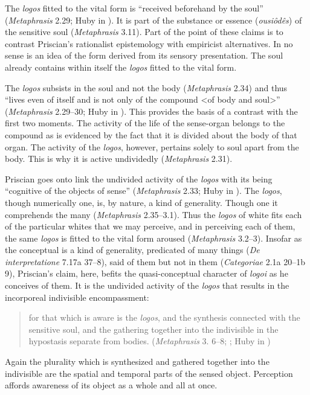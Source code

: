 \documentclass[12pt]{article}
\begin{document}
The \emph{logos} fitted to the vital form is ``received beforehand by the soul'' (\emph{Metaphrasis} 2.29; Huby in \citealt[10]{Sorabji:1997ly}). It is part of the substance or essence (\emph{ousiôdês}) of the sensitive soul (\emph{Metaphrasis} 3.11). Part of the point of these claims is to contrast Priscian's rationalist epistemology with empiricist alternatives. In no sense is an idea of the form derived from its sensory presentation. The soul already contains within itself the \emph{logos} fitted to the vital form.

The \emph{logos} subsists in the soul and not the body (\emph{Metaphrasis} 2.34) and thus ``lives even of itself and is not only of the compound <of body and soul>'' (\emph{Metaphrasis} 2.29--30; Huby in \citealt[10]{Sorabji:1997ly}). This provides the basis of a contrast with the first two moments. The activity of the life of the sense-organ belongs to the compound as is evidenced by the fact that it is divided about the body of that organ. The activity of the \emph{logos}, however, pertains solely to soul apart from the body. This is why it is active undividedly (\emph{Metaphrasis} 2.31).

Priscian goes onto link the undivided activity of the \emph{logos} with its being ``cognitive of the objects of sense'' (\emph{Metaphrasis} 2.33; Huby in \citealt[10]{Sorabji:1997ly}). The \emph{logos}, though numerically one, is, by nature, a kind of generality. Though one it comprehends the many (\emph{Metaphrasis} 2.35--3.1). Thus the \emph{logos} of white fits each of the particular whites that we may perceive, and in perceiving each of them, the same \emph{logos} is fitted to the vital form aroused (\emph{Metaphrasis} 3.2--3). Insofar as the conceptual is a kind of generality, predicated of many things (\emph{De interpretatione} 7.17a 37--8), said of them but not in them (\emph{Categoriae} 2.1a 20--1b 9), Priscian's claim, here, befits the quasi-conceptual character of \emph{logoi} as he conceives of them. It is the undivided activity of the \emph{logos} that results in the incorporeal indivisible encompassment:
\begin{quote}
	for that which is aware is the \emph{logos}, and the synthesis connected with the sensitive soul, and the gathering together into the indivisible in the hypostasis separate from bodies. (\emph{Metaphrasis} 3. 6--8; ; Huby in \citealt[11]{Sorabji:1997ly})
\end{quote}
Again the plurality which is synthesized and gathered together into the indivisible are the spatial and temporal parts of the sensed object. Perception affords awareness of its object as a whole and all at once.
\end{document}

